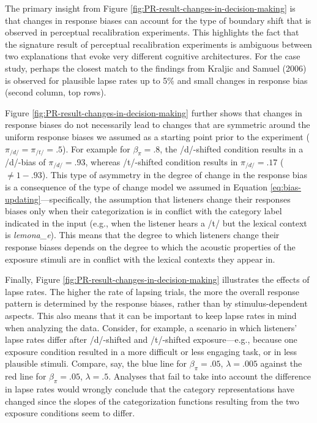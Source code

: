 \documentclass[
  11pt,
  man,floatsintext]{apa6}
\begin{document}
The primary insight from Figure \ref{fig:PR-result-changes-in-decision-making} is that changes in response biases can account for the type of boundary shift that is observed in perceptual recalibration experiments. This highlights the fact that the signature result of perceptual recalibration experiments is ambiguous between two explanations that evoke very different cognitive architectures. For the case study, perhaps the closest match to the findings from Kraljic and Samuel (2006) is observed for plausible lapse rates up to 5\% and small changes in response bias (second column, top rows).

Figure \ref{fig:PR-result-changes-in-decision-making} further shows that changes in response biases do not necessarily lead to changes that are symmetric around the uniform response biases we assumed as a starting point prior to the experiment (\(\pi_{/d/}=\pi_{/t/}=.5\)). For example for \(\beta_{\pi} = .8\), the /d/-shifted condition results in a /d/-bias of \(\pi_{/d/}=.93\), whereas /t/-shifted condition results in \(\pi_{/d/}=.17\) (\(\neq 1 - .93\)). This type of asymmetry in the degree of change in the response bias is a consequence of the type of change model we assumed in Equation \eqref{eq:bias-updating}---specifically, the assumption that listeners change their responses biases only when their categorization is in conflict with the category label indicated in the input (e.g., when the listener hears a /t/ but the lexical context is \emph{lemona\_e}). This means that the degree to which listeners change their response biases depends on the degree to which the acoustic properties of the exposure stimuli are in conflict with the lexical contexts they appear in.

Finally, Figure \ref{fig:PR-result-changes-in-decision-making} illustrates the effects of lapse rates. The higher the rate of lapsing trials, the more the overall response pattern is determined by the response biases, rather than by stimulus-dependent aspects. This also means that it can be important to keep lapse rates in mind when analyzing the data. Consider, for example, a scenario in which listeners' lapse rates differ after /d/-shifted and /t/-shifted exposure---e.g., because one exposure condition resulted in a more difficult or less engaging task, or in less plausible stimuli. Compare, say, the blue line for \(\beta_{\pi} = .05\), \(\lambda = .005\) against the red line for \(\beta_{\pi} = .05\), \(\lambda = .5\). Analyses that fail to take into account the difference in lapse rates would wrongly conclude that the category representations have changed since the slopes of the categorization functions resulting from the two exposure conditions seem to differ.
\end{document}
